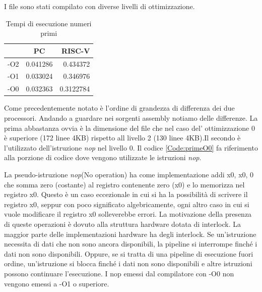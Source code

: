 \documentclass[12pt,a4paper]{report}
\begin{document}


I file sono stati compilato con diverse livelli di ottimizzazione.
\begin{table}[h]
\begin{tabular}{|l|c|r|}
\hline
    & PC       & RISC-V    \\ \hline
-O2 & 0.041286 & 0.434372  \\ \hline
-O1 & 0.033024 & 0.346976  \\ \hline
-O0 & 0.032363 & 0.3122784 \\ \hline
\end{tabular}
\caption{Tempi di esecuzione numeri primi}
\label{Tab:TempoPrime}
\end{table}
Come precedentemente notato è l'ordine di grandezza di differenza dei due processori. Andando a guardare nei sorgenti assembly notiamo delle differenze. La prima abbastanza ovvia è la dimensione del file che nel caso del' ottimizzazione 0 è superiore (172 linee 4KB) rispetto all livello 2 (130 linee 4KB).Il secondo è l'utilizzato dell'istruzione \textit{nop} nel livello 0.
Il codice \ref{Code:primeO0} fa riferimento alla porzione di codice dove vengono utilizzate le istruzioni \textit{nop}.



La pseudo-istruzione \textit{nop}(No operation) ha come implementazione addi x0, x0, 0 che somma zero (costante) al registro contenente zero (x0) e lo memorizza nel registro x0.  Questo è un caso eccezionale in cui si ha la possibilità di scrivere il registro x0, seppur con poco significato algebricamente, ogni altro caso in cui si vuole modificare il registro x0 solleverebbe errori. La motivazione della presenza di queste operazioni è dovuto alla struttura hardware dotata di interlock. %
La maggior parte delle implementazioni hardware ha degli interlock. Se un'istruzione necessita di dati che non sono ancora disponibili, la pipeline si interrompe finché i dati non sono disponibili. Oppure, se si tratta di una pipeline di esecuzione fuori ordine, un'istruzione si blocca finché i dati non sono disponibili e altre istruzioni possono continuare l'esecuzione.
I nop emessi dal compilatore con -O0  non vengono emessi a -O1 o superiore. 
\end{document}
